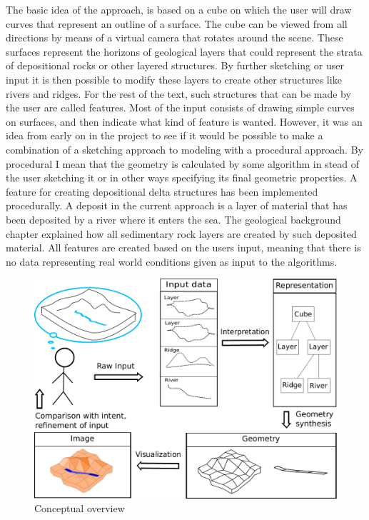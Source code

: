 \documentclass[a4paper,12pt]{report}
\begin{document}
The basic idea of the approach, is based on a cube on which the user will draw curves that represent an outline of a surface. The cube can be viewed from all directions by means of a virtual camera that rotates around the scene. These surfaces represent the horizons of geological layers that could represent the strata of depositional rocks or other layered structures. By further sketching or user input it is then possible to modify these layers to create other structures like rivers and ridges. For the rest of the text, such structures that can be made by the user are called features. Most of the input consists of drawing simple curves on surfaces, and then indicate what kind of feature is wanted. However, it was an idea from early on in the project to see if it would be possible to make a combination of a sketching approach to modeling with a procedural approach. By procedural I mean that the geometry is calculated by some algorithm in stead of the user sketching it or in other ways specifying its final 
geometric properties. A feature for creating depositional delta structures has been implemented procedurally. A deposit in the current approach is a layer of material that has been deposited by a river where it enters the sea. The geological background chapter explained how all sedimentary rock layers are created by such deposited material. All features are created based on the users input, meaning that there is no data representing real world conditions given as input to the algorithms.
\begin{figure}[h]
 \includegraphics[width=\linewidth]{thesis/overviewConcept.pdf}
 \caption{Conceptual overview}
 \label{fig:overviewConcept}
\end{figure}
\end{document}
